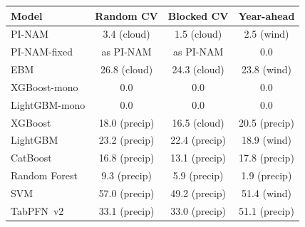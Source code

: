 \begin{tabular}{lccc}
\toprule
Model & Random CV & Blocked CV & Year-ahead \\
\midrule
PI-NAM & 3.4 (cloud) & 1.5 (cloud) & 2.5 (wind) \\
PI-NAM-fixed & \multicolumn{1}{c}{as PI-NAM} & \multicolumn{1}{c}{as PI-NAM} & 0.0 \\
EBM & 26.8 (cloud) & 24.3 (cloud) & 23.8 (wind) \\
XGBoost-mono & 0.0 & 0.0 & 0.0 \\
LightGBM-mono & 0.0 & 0.0 & 0.0 \\
XGBoost & 18.0 (precip) & 16.5 (cloud) & 20.5 (precip) \\
LightGBM & 23.2 (precip) & 22.4 (precip) & 18.9 (wind) \\
CatBoost & 16.8 (precip) & 13.1 (precip) & 17.8 (precip) \\
Random Forest & 9.3 (precip) & 5.9 (precip) & 1.9 (precip) \\
SVM & 57.0 (precip) & 49.2 (precip) & 51.4 (wind) \\
TabPFN~v2 & 33.1 (precip) & 33.0 (precip) & 51.1 (precip) \\
\bottomrule
\end{tabular}
